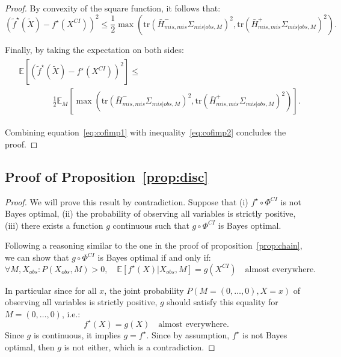 \documentclass{article}
\newcommand{\E}{\mathbb{E}}
\newcommand{\br}[1]{\left(#1\right)}
\newcommand{\sqb}[1]{\left[#1\right]}
\theoremstyle{plain}
\begin{document}
\begin{proof}
    By convexity of the square function, it follows that:
    \begin{equation}
        \br{\tilde f^\star(\widetilde X) - f^\star(X^{CI})}^2 \leq \frac{1}{2} \max \br{\text{tr}\br{ \bar{H}^-_{mis, mis} \Sigma_{mis|obs, M}}^2,  \text{tr}\br{\bar{H}^+_{mis, mis} \Sigma_{mis|obs, M}}^2}.
    \end{equation}
    
    Finally, by taking the expectation on both sides:
    \begin{align}
        \begin{split}
            \label{eq:cofimp2}
            &\E \sqb{\br{\tilde f^\star(\widetilde X) - f^\star(X^{CI})}^2} \leq \\
            & \hspace{4em} \frac{1}{2} \E_M \sqb{\max \br{\text{tr}\br{ \bar{H}^-_{mis, mis} \Sigma_{mis|obs, M}}^2,  \text{tr}\br{\bar{H}^+_{mis, mis} \Sigma_{mis|obs, M}}^2}}.
        \end{split}
    \end{align}

    Combining equation~\eqref{eq:cofimp1} with inequality~\eqref{eq:cofimp2} concludes the proof.
\end{proof}


\subsection{Proof of Proposition~\ref{prop:disc}}
\label{ss:proof_prop_disc}

\propdisc*

\begin{proof}
    We will prove this result by contradiction. Suppose that (i) $f^\star \circ \Phi^{CI}$ is not Bayes optimal, (ii) the probability of observing all variables is strictly positive, (iii) there exists a function $g$ continuous such that $g \circ \Phi^{CI}$ is Bayes optimal.
    
    Following a reasoning similar to the one in the proof of proposition~\ref{prop:chain}, we can show that $g \circ \Phi^{CI}$ is Bayes optimal if and only if:
    \begin{equation*}
        \forall M, X_{obs}: P(X_{obs}, M)>0, \quad \E\sqb{f^\star(X)|X_{obs}, M} = g(X^{CI}) \quad \text{almost everywhere}.
    \end{equation*}
    
    In particular since for all $x$, the joint probability $P(M = (0, \dots, 0), X=x)$ of observing all variables is strictly positive, $g$ should satisfy this equality for $M = (0, \dots, 0)$, i.e.:
    \begin{equation*}
        f^\star(X) = g(X) \quad \text{almost everywhere}.
    \end{equation*}
    Since $g$ is continuous, it implies $g = f^\star$.
    Since by assumption, $f^\star$ is not Bayes optimal, then $g$ is not either, which is a contradiction.
\end{proof}
\end{document}
